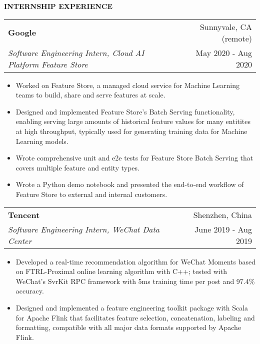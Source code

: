 \documentclass[letterpaper,11pt]{article}
\makeatletter
\newcommand{\resitem}[1]{\item  #1}
\newcommand{\resheading}[1]{{\large \colorbox{mygrey}{\begin{minipage}{\linewidth}{\textbf{#1 \vphantom{p\^{E}}}}\end{minipage}}}}
\newcommand{\ressubheading}[4]{
\begin{tabular*}{1.04\linewidth}{l@{\extracolsep{\fill}}r}
		\textbf{#1} & #2 \\
		\textit{#3} & #4 \\
\end{tabular*}\vspace{-6pt}}
\makeatother
\begin{document}
\resheading{INTERNSHIP EXPERIENCE}
	\begin{description}
		\item 
			\ressubheading{Google}{Sunnyvale, CA (remote)}
				{Software Engineering Intern, Cloud AI Platform Feature Store}{May 2020 - Aug 2020}
				{ \footnotesize
				\begin{itemize}
					\resitem{Worked on Feature Store, a managed cloud service for Machine Learning teams to build, share and serve features at scale.}
					\resitem{Designed and implemented Feature Store's Batch Serving functionality, enabling serving large amounts of historical feature values for many entitites at high throughput, typically used for generating training data for Machine Learning models.}
					\resitem{Wrote comprehensive unit and e2e tests for Feature Store Batch Serving that covers multiple feature and entity types.}
					\resitem{Wrote a Python demo notebook and presented the end-to-end workflow of Feature Store to external and internal customers.}		
				\end{itemize}
				}
		\item 
			\ressubheading{Tencent}{Shenzhen, China}
				{Software Engineering Intern, WeChat Data Center}{June 2019 - Aug 2019}
				{ \footnotesize
				\begin{itemize}
					\resitem{Developed a real-time recommendation algorithm for WeChat Moments based on FTRL-Proximal online learning algorithm with C++; tested with WeChat's SvrKit RPC framework with 5ms training time per post and 97.4\% accuracy.}
					\resitem{Designed and implemented a feature engineering toolkit package with Scala for Apache Flink that facilitates feature selection, concatenation, labeling and formatting, compatible with all major data formats supported by Apache Flink.}
				\end{itemize}
				}
	\end{description}  %
\end{document}

